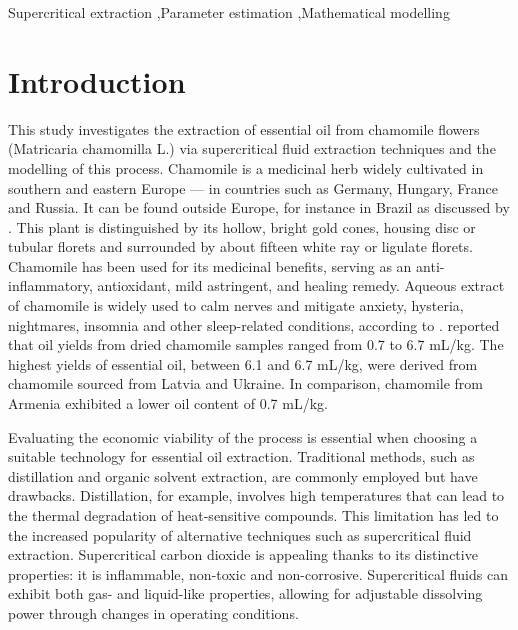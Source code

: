 \documentclass[a4paper,fleqn]{cas-dc}
\begin{document}
\begin{keywords}
Supercritical extraction \sep Parameter estimation \sep Mathematical modelling
\end{keywords}

\maketitle


\section{Introduction}

This study investigates the extraction of essential oil from chamomile flowers (Matricaria chamomilla L.) via supercritical fluid extraction techniques and the modelling of this process. Chamomile is a medicinal herb widely cultivated in southern and eastern Europe — in countries such as Germany, Hungary, France and Russia. It can be found outside Europe, for instance in Brazil as discussed by \citet{Singh2011}. This plant is distinguished by its hollow, bright gold cones, housing disc or tubular florets and surrounded by about fifteen white ray or ligulate florets. Chamomile has been used for its medicinal benefits, serving as an anti-inflammatory, antioxidant, mild astringent, and healing remedy. Aqueous extract of chamomile is widely used to calm nerves and mitigate anxiety, hysteria, nightmares, insomnia and other sleep-related conditions, according to \citet{Srivastava2009}. \citet{Orav2010} reported that oil yields from dried chamomile samples ranged from 0.7 to 6.7 mL/kg. The highest yields of essential oil, between 6.1 and 6.7 mL/kg, were derived from chamomile sourced from Latvia and Ukraine. In comparison, chamomile from Armenia exhibited a lower oil content of 0.7 mL/kg.

Evaluating the economic viability of the process is essential when choosing a suitable technology for essential oil extraction. Traditional methods, such as distillation and organic solvent extraction, are commonly employed but have drawbacks. Distillation, for example, involves high temperatures that can lead to the thermal degradation of heat-sensitive compounds. This limitation has led to the increased popularity of alternative techniques such as supercritical fluid extraction. Supercritical carbon dioxide is appealing thanks to its distinctive properties: it is inflammable, non-toxic and non-corrosive. Supercritical fluids can exhibit both gas- and liquid-like properties, allowing for adjustable dissolving power through changes in operating conditions.
\end{document}

